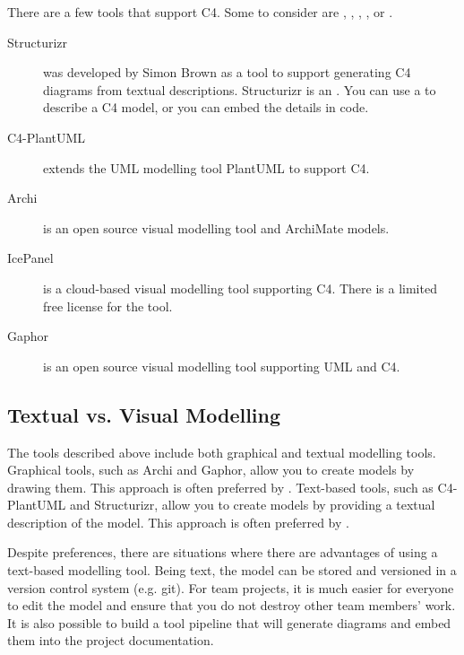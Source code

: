 There are a few tools that support C4. Some to consider are ,
, ,
, or .

\begin{description}
    \item[Structurizr]
        was developed by Simon Brown as a tool to support generating C4 diagrams from textual descriptions.
                Structurizr is an .
        You can use a  to describe a C4 model,
        or you can embed the details in  code.
    \item[C4-PlantUML] extends the UML modelling tool PlantUML to support C4.
    \item[Archi] is an open source visual modelling tool
         and ArchiMate models.
    \item[IcePanel] is a cloud-based visual modelling tool supporting C4. There is a limited free license for the tool.
    \item[Gaphor] is an open source visual modelling tool supporting UML and C4.
\end{description}

\subsection{Textual vs. Visual Modelling}
The tools described above include both graphical and textual modelling tools.
Graphical tools, such as Archi and Gaphor, allow you to create models by drawing them.
This approach is often preferred by .
Text-based tools, such as C4-PlantUML and Structurizr, allow you to create models by providing a textual description of the model.
This approach is often preferred by .

Despite preferences, there are situations where there are advantages of using a text-based modelling tool.
Being text, the model can be stored and versioned in a version control system (e.g. git).
For team projects, it is much easier for everyone to edit the model and ensure that you do not destroy other team members' work.
It is also possible to build a tool pipeline that will generate diagrams and embed them into the project documentation.

